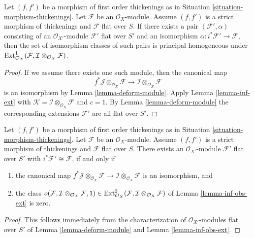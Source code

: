 \begin{lemma}
\label{lemma-inf-ext-rel}
Let $(f, f')$ be a morphism of first order thickenings as in
Situation \ref{situation-morphism-thickenings}.
Let $\mathcal{F}$ be an $\mathcal{O}_X$-module.
Assume $(f, f')$ is a strict morphism of thickenings and
$\mathcal{F}$ flat over $S$. If there exists a pair
$(\mathcal{F}', \alpha)$ consisting of an
$\mathcal{O}_{X'}$-module $\mathcal{F}'$ flat over $S'$ and an isomorphism
$\alpha : i^*\mathcal{F}' \to \mathcal{F}$, then the set of
isomorphism classes of such pairs is principal homogeneous
under
$\mathop{\mathrm{Ext}}\nolimits^1_{\mathcal{O}_X}(
\mathcal{F}, \mathcal{I} \otimes_{\mathcal{O}_X} \mathcal{F})$.
\end{lemma}

\begin{proof}
If we assume there exists one such module, then the canonical map
$$
f^*\mathcal{J} \otimes_{\mathcal{O}_X} \mathcal{F} \to
\mathcal{I} \otimes_{\mathcal{O}_X} \mathcal{F}
$$
is an isomorphism by Lemma \ref{lemma-deform-module}. Apply
Lemma \ref{lemma-inf-ext} with $\mathcal{K} = 
\mathcal{I} \otimes_{\mathcal{O}_X} \mathcal{F}$
and $c = 1$. By Lemma \ref{lemma-deform-module} the corresponding extensions
$\mathcal{F}'$ are all flat over $S'$.
\end{proof}

\begin{lemma}
\label{lemma-inf-obs-ext-rel}
Let $(f, f')$ be a morphism of first order thickenings as in
Situation \ref{situation-morphism-thickenings}.
Let $\mathcal{F}$ be an $\mathcal{O}_X$-module. Assume
$(f, f')$ is a strict morphism of thickenings
and $\mathcal{F}$ flat over $S$. There exists an
$\mathcal{O}_{X'}$-module $\mathcal{F}'$ flat over $S'$ with
$i^*\mathcal{F}' \cong \mathcal{F}$, if and only if
\begin{enumerate}
\item the canonical map $
f^*\mathcal{J} \otimes_{\mathcal{O}_X} \mathcal{F} \to
\mathcal{I} \otimes_{\mathcal{O}_X} \mathcal{F}$
is an isomorphism, and
\item the class
$o(\mathcal{F}, \mathcal{I} \otimes_{\mathcal{O}_X} \mathcal{F}, 1)
\in \mathop{\mathrm{Ext}}\nolimits^2_{\mathcal{O}_X}(
\mathcal{F}, \mathcal{I} \otimes_{\mathcal{O}_X} \mathcal{F})$
of Lemma \ref{lemma-inf-obs-ext} is zero.
\end{enumerate}
\end{lemma}

\begin{proof}
This follows immediately from the characterization of
$\mathcal{O}_{X'}$-modules flat over $S'$ of 
Lemma \ref{lemma-deform-module} and
Lemma \ref{lemma-inf-obs-ext}.
\end{proof}






